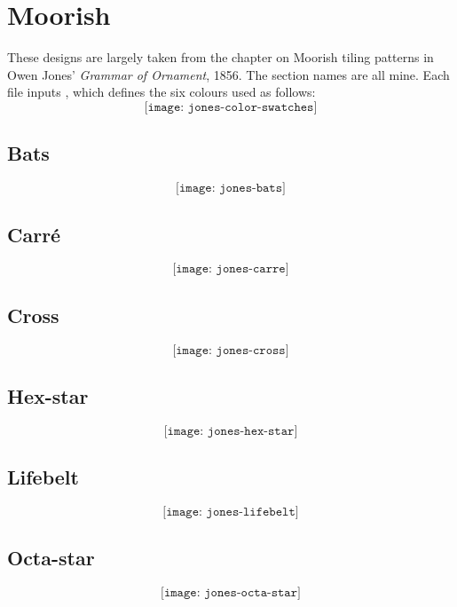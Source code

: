 \documentclass[a4paper]{scrartcl}
\begin{document}
\section{Moorish}

These designs are largely taken from the chapter on Moorish tiling patterns in Owen
Jones' \textit{Grammar of Ornament}, 1856. The section names are all mine.  Each file inputs
, which defines the six colours used as follows:
$$\texttt{[image: jones-color-swatches]}$$

\subsection{Bats}
$$\texttt{[image: jones-bats]}$$

\subsection{Carré}
$$\texttt{[image: jones-carre]}$$

\subsection{Cross}
$$\texttt{[image: jones-cross]}$$

\subsection{Hex-star}
$$\texttt{[image: jones-hex-star]}$$

\subsection{Lifebelt}
$$\texttt{[image: jones-lifebelt]}$$

\subsection{Octa-star}
$$\texttt{[image: jones-octa-star]}$$
\end{document}
